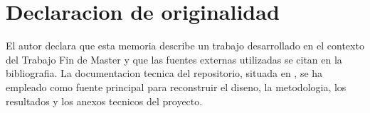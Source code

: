 \chapter*{Declaracion de originalidad}

El autor declara que esta memoria describe un trabajo desarrollado en el contexto del Trabajo Fin de Master y que las fuentes externas utilizadas se citan en la bibliografia. La documentacion tecnica del repositorio, situada en , se ha empleado como fuente principal para reconstruir el diseno, la metodologia, los resultados y los anexos tecnicos del proyecto.

